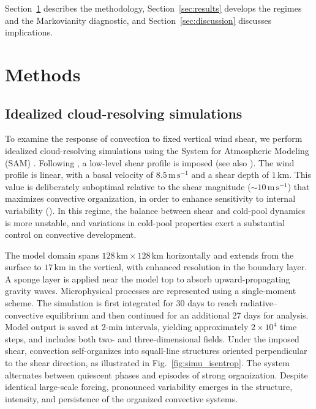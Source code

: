 \documentclass[11pt]{article}
\begin{document}
Section~\ref{sec:methods} describes the methodology, Section~\ref{sec:results} develops the regimes and the Markovianity diagnostic, and Section~\ref{sec:discussion} discusses implications.

\section{Methods}\label{sec:methods}

\subsection{Idealized cloud-resolving simulations}

To examine the response of convection to fixed vertical wind shear, we perform idealized cloud-resolving simulations using the System for Atmospheric Modeling (SAM) \cite{khairoutdinov2003}. Following \cite{muller2013impact}, a low-level shear profile is imposed (see also \cite{rotunno1988theory, houze1977structure, robe2001effect}). The wind profile is linear, with a basal velocity of $8.5\,\mathrm{m\,s^{-1}}$ and a shear depth of $1\,\mathrm{km}$. This value is deliberately suboptimal relative to the shear magnitude ($\sim10\,\mathrm{m\,s^{-1}}$) that maximizes convective organization, in order to enhance sensitivity to internal variability (\cite{abramian2022shear}). In this regime, the balance between shear and cold-pool dynamics is more unstable, and variations in cold-pool properties exert a substantial control on convective development.

The model domain spans $128\,\mathrm{km} \times 128\,\mathrm{km}$ horizontally and extends from the surface to $17\,\mathrm{km}$ in the vertical, with enhanced resolution in the boundary layer. A sponge layer is applied near the model top to absorb upward-propagating gravity waves. Microphysical processes are represented using a single-moment scheme. The simulation is first integrated for 30 days to reach radiative--convective equilibrium and then continued for an additional 27 days for analysis. Model output is saved at 2-min intervals, yielding approximately $2\times10^{4}$ time steps, and includes both two- and three-dimensional fields. Under the imposed shear, convection self-organizes into squall-line structures oriented perpendicular to the shear direction, as illustrated in Fig.~\ref{fig:simu_isentrop}. The system alternates between quiescent phases and episodes of strong organization. Despite identical large-scale forcing, pronounced variability emerges in the structure, intensity, and persistence of the organized convective systems.
\end{document}
